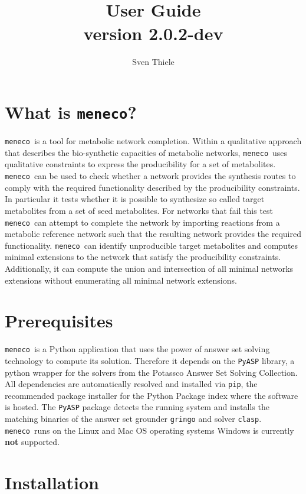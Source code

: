 \documentclass{article}
\title{ \meneco  \\
User Guide \\
version 2.0.2-dev
}
\author{Sven Thiele}
\date{}
\newcommand\meneco{\texttt{meneco}}
\begin{document}
\maketitle

\section{What is \meneco?}

\meneco\ is a tool for metabolic network completion.
Within a qualitative approach that describes the bio-synthetic capacities of metabolic networks,
 \meneco\ uses qualitative constraints to express the producibility for a set of metabolites.
\meneco\ can be used to check whether a network provides the synthesis routes to comply
 with the required functionality described by the producibility constraints.
In particular it tests whether it is possible to synthesize so called target metabolites from a set of seed metabolites.
For networks that fail this test \meneco\ can attempt to complete the network by importing reactions
from a metabolic reference network such that the resulting network provides the required functionality.
\meneco\ can identify unproducible target metabolites and computes minimal extensions to the network that satisfy the producibility constraints.
Additionally, it can compute the union and intersection of all minimal networks extensions without enumerating all minimal network extensions.


\section{Prerequisites}
\meneco\ is a Python application that uses the power of answer set solving technology to compute its solution.
Therefore it depends on the \texttt{PyASP} library, a python wrapper for the solvers from the Potassco Answer Set Solving Collection.
All dependencies are automatically resolved and installed via \texttt{pip}, the recommended package installer for the Python Package index where the software is hosted.
The \texttt{PyASP} package detects the running system and installs the matching binaries of the answer set grounder \texttt{gringo} and solver \texttt{clasp}.
\meneco\ runs on the Linux and Mac OS operating systems Windows is currently {\bf not} supported.


\section{Installation}
\end{document}
